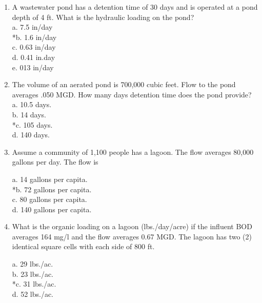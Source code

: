 \begin{enumerate}
\item  A wastewater pond has a detention time of 30 days and is operated at a pond depth of 4 ft.  What is the hydraulic loading on the pond? \\


a. 7.5 in/day \\

*b. 1.6 in/day \\

c. 0.63 in/day \\

d. 0.41 in.day \\

e. 013 in/day \\


\item  The volume of an aerated pond is 700,000 cubic feet.  Flow to the pond averages .050 MGD. How many days detention time does the pond provide? \\


a. 10.5 days. \\

b. 14 days. \\

*c. 105 days. \\

d. 140 days. \\



\item  Assume a community of 1,100 people has a lagoon. The flow averages 80,000 gallons per day. The flow is 

a. 14 gallons per capita. \\
*b. 72 gallons per capita. \\
c. 80 gallons per capita. \\
d. 140 gallons per capita. 

\item  What is the organic loading on a lagoon (lbs./day/acre) if the influent BOD averages 164 mg/l and the flow averages 0.67 MGD. The lagoon has two (2) identical square cells with each side of 800 ft. 

a. 29 lbs./ac. \\
b. 23 lbs./ac. \\
*c. 31 lbs./ac. \\
d. 52 lbs./ac. \\



\end{enumerate}
